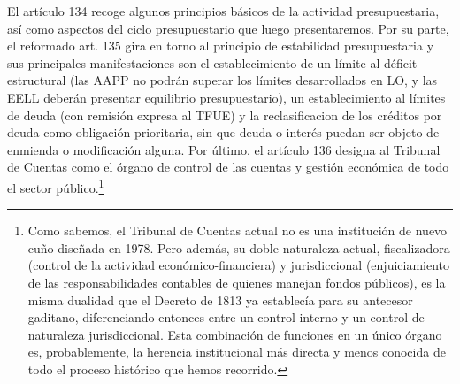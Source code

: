 \documentclass[10pt,a4paper]{article}
\begin{document}
El artículo 134 recoge algunos principios básicos de la actividad presupuestaria, así como aspectos del ciclo presupuestario que luego presentaremos. Por su parte, el reformado art. 135 gira en torno al principio de estabilidad presupuestaria y sus principales manifestaciones son el establecimiento de un límite al déficit estructural (las AAPP no podrán superar los límites desarrollados en LO, y las EELL deberán presentar equilibrio presupuestario),  un establecimiento al límites de deuda (con remisión expresa al TFUE) y la reclasificacion de los créditos por deuda como obligación prioritaria, sin que deuda o interés puedan ser objeto de enmienda o modificación alguna. Por último. el artículo 136 designa al Tribunal de Cuentas como el órgano de control de las cuentas y gestión económica de todo el sector público.\footnote{%
    Como sabemos, el Tribunal de Cuentas actual no es una institución de nuevo cuño diseñada en 1978. Pero además, su doble naturaleza actual, fiscalizadora (control de la actividad económico-financiera) y jurisdiccional (enjuiciamiento de las responsabilidades contables de quienes manejan fondos públicos), es la misma dualidad que el Decreto de 1813 ya establecía para su antecesor gaditano, diferenciando entonces entre un control interno y un control de naturaleza jurisdiccional. Esta combinación de funciones en un único órgano es, probablemente, la herencia institucional más directa y menos conocida de todo el proceso histórico que hemos recorrido.
}
\end{document}
